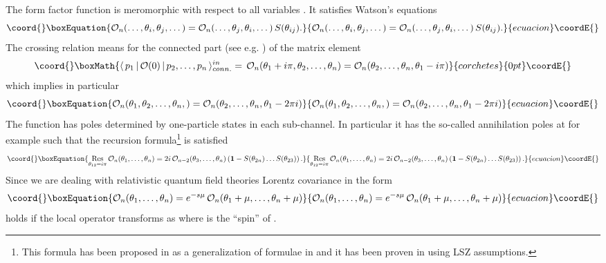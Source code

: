 \documentclass[a4paper,a4paper]{article}
\begin{document}
The form factor function \coordHE{} is
meromorphic with respect to all variables \coordHE{}.
It satisfies Watson's equations 
\begin{equation}\coord{}\boxEquation{
\mathcal{O}_{n}(\dots ,\theta _{i},\theta _{j},\dots )=\mathcal{O}_{n}(\dots
,\theta _{j},\theta _{i},\dots )\,S(\theta _{ij}).  \label{pf1}
}{
\mathcal{O}_{n}(\dots ,\theta _{i},\theta _{j},\dots )=\mathcal{O}_{n}(\dots
,\theta _{j},\theta _{i},\dots )\,S(\theta _{ij}).  }{ecuacion}\coordE{}\end{equation}
The crossing relation means for the connected part (see e.g. \cite{BK}) of
the matrix element 
\[\coord{}\boxMath{
\langle \,p_{1}\,|\,\mathcal{O}(0)\,|\,p_{2},\dots ,p_{n}\,\rangle
_{conn.}^{in}=\,\mathcal{O}_{n}(\theta _{1}+i\pi ,\theta _{2},\dots ,\theta
_{n})=\mathcal{O}_{n}(\theta _{2},\dots ,\theta _{n},\theta _{1}-i\pi ) 
}{corchetes}{0pt}\coordE{}\]
which implies in particular 
\begin{equation}\coord{}\boxEquation{
\mathcal{O}_{n}(\theta _{1},\theta _{2},\dots ,\theta _{n},)=\mathcal{O}
_{n}(\theta _{2},\dots ,\theta _{n},\theta _{1}-2\pi i)  \label{pf2}
}{
\mathcal{O}_{n}(\theta _{1},\theta _{2},\dots ,\theta _{n},)=\mathcal{O}
_{n}(\theta _{2},\dots ,\theta _{n},\theta _{1}-2\pi i)  }{ecuacion}\coordE{}\end{equation}
The function \coordHE{} has poles determined
by one-particle states in each sub-channel. In particular it has the
so-called annihilation poles at for example \coordHE{} such that
the recursion formula\footnote{%
This formula has been proposed in \cite{Sm} as a generalization of formulae
in \cite{KW} and it has been proven in \cite{BFKZ} using LSZ assumptions.}
is satisfied 
\begin{equation}\coord{}\boxEquation{
\mathop{\rm Res}_{\theta _{12}=i\pi }\mathcal{O}_{n}(\theta _{1},\dots
,\theta _{n})=2i\,\mathcal{O}_{n-2}(\theta _{3},\dots ,\theta _{n})\left( 
\mathbf{1}-S(\theta _{2n})\dots S(\theta _{23})\right) .  \label{pf3}
}{
\mathop{\rm Res}_{\theta _{12}=i\pi }\mathcal{O}_{n}(\theta _{1},\dots
,\theta _{n})=2i\,\mathcal{O}_{n-2}(\theta _{3},\dots ,\theta _{n})\left( 
\mathbf{1}-S(\theta _{2n})\dots S(\theta _{23})\right) .  }{ecuacion}\coordE{}\end{equation}
Since we are dealing with relativistic quantum field theories Lorentz
covariance in the form 
\begin{equation}\coord{}\boxEquation{
\mathcal{O}_{n}(\theta _{1},\dots ,\theta _{n})=e^{-s\mu }\,\mathcal{O}
_{n}(\theta _{1}+\mu ,\dots ,\theta _{n}+\mu )  \label{pf5}
}{
\mathcal{O}_{n}(\theta _{1},\dots ,\theta _{n})=e^{-s\mu }\,\mathcal{O}
_{n}(\theta _{1}+\mu ,\dots ,\theta _{n}+\mu )  }{ecuacion}\coordE{}\end{equation}
holds if the local operator transforms as \coordHE{} where \coordHE{} is the ``spin'' of \coordHE{}.
\end{document}
